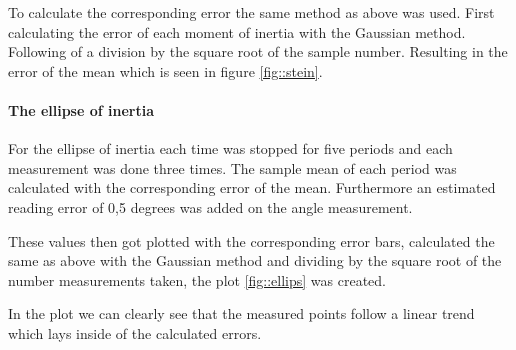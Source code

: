 To calculate the corresponding error the same method as above was used.
First calculating the error of each moment of inertia with the Gaussian method.
Following of a division by the square root of the sample number.
Resulting in the error of the mean which is seen in figure \ref{fig::stein}.




\paragraph{The ellipse of inertia}

For the ellipse of inertia each time was stopped for five periods and each measurement was done three times.
The sample mean of each period was calculated with the corresponding error of the mean.
Furthermore an estimated reading error of 0,5 degrees was added on the angle measurement.

These values then got plotted with the corresponding error bars, calculated the same as above with the Gaussian method and dividing by the square root of the number measurements taken, the plot \ref{fig::ellips} was created.

In the plot we can clearly see that the measured points follow a linear trend which lays inside of the calculated errors.









